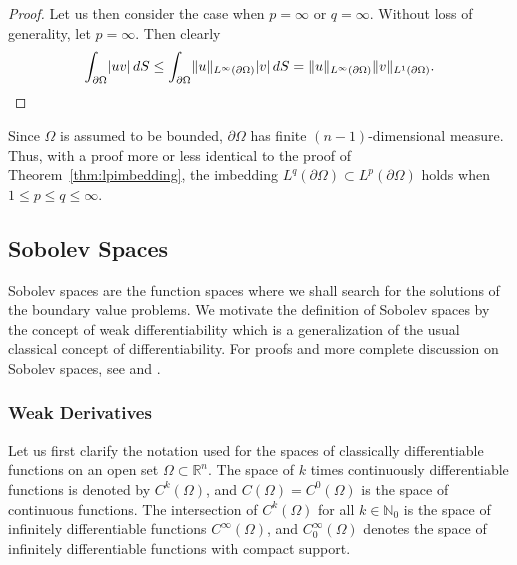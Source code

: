 \documentclass[english, 12pt, a4paper, sci, utf8, a-2b, online]{aaltothesis}
\theoremstyle{definition}
\theoremstyle{plain}
\DeclarePairedDelimiter\abs{\lvert}{\rvert}
\DeclarePairedDelimiter\norm{\lVert}{\rVert}
\newcommand*\diff{\mathop{}\!d}
\numberwithin{equation}{section}
\begin{document}
\begin{proof}
    Let us then consider the case when $p=\infty$ or $q=\infty$.
    Without loss of generality, let $p=\infty$. Then clearly
    \begin{equation*}
        \int_{\partial \Omega} \abs{uv} \diff S
        \leq \int_{\partial \Omega} \norm{u}_{L^{\infty}(\partial \Omega)}
            \abs{v} \diff S
        = \norm{u}_{L^{\infty}(\partial \Omega)} \norm{v}_{L^1(\partial \Omega)}.
    \end{equation*}
\end{proof}
Since $\Omega$ is assumed to be bounded,
$\partial \Omega$ has finite $(n-1)$-dimensional measure.
Thus, with a proof more or less identical to the proof of 
Theorem~\ref{thm:lpimbedding}, the imbedding
$L^q(\partial \Omega) \subset L^p(\partial \Omega)$
holds when $1 \leq p \leq q \leq \infty$.

\subsection{Sobolev Spaces}
\label{subsec:sobolevspaces}

Sobolev spaces are the function spaces where we shall search for the solutions
of the boundary value problems. We motivate the definition of
Sobolev spaces by the concept of weak differentiability which is a generalization
of the usual classical concept of differentiability.
For proofs and more complete discussion
on Sobolev spaces, see \cite{necas2011} and \cite{adams2003}.

\subsubsection{Weak Derivatives}
\label{subsubsec:weakderivatives}

Let us first clarify the notation used for the spaces of classically
differentiable functions on an open set $\Omega \subset \mathbb{R}^n$.
The space of $k$ times continuously differentiable functions is denoted by
$C^k(\Omega)$, and $C(\Omega) = C^0(\Omega)$ is the space of continuous functions.
The intersection of $C^k(\Omega)$ for all $k \in \mathbb{N}_0$
is the space of infinitely differentiable functions $C^{\infty}(\Omega)$,
and $C_0^{\infty}(\Omega)$ denotes the space of infinitely differentiable
functions with compact support.
\end{document}
